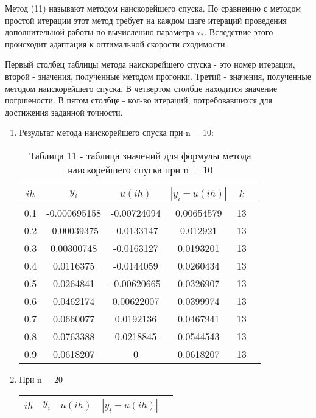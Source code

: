 \documentclass[a4paper,12pt]{article}
\begin{document}
Метод (11) называют методом наискорейшего спуска. По сравнению с методом простой итерации этот метод
требует на каждом шаге итераций проведения дополнительной работы по вычислению параметра $\tau_*$. 
Вследствие этого происходит адаптация к оптимальной скорости сходимости.

Первый столбец таблицы метода наискорейшего спуска - это номер итерации, второй - значения, полученные методом 
прогонки. Третий - значения, полученные методом наискорейшего спуска. В четвертом столбце находится значение погршености.
В пятом столбце - кол-во итераций, потребовавшихся для достижения заданной точности.

\begin{enumerate}[label = \arabic*.]
  \item{Результат метода наискорейшего спуска при n = 10:
    \begin{table}[h]
      \centering
      \begin{tabular}{|c|c|c|c|c|c|}
        \hline
        $ih$ & $y_i$ & $u(ih)$ & $\left|y_i-u(ih)\right|$ & $k$\\ \hline
        0.1 & -0.000695158 &  -0.00724094 &   0.00654579 & 13\\ \hline
        0.2 &  -0.00039375 &   -0.0133147 &     0.012921 & 13\\ \hline
        0.3 &   0.00300748 &   -0.0163127 &    0.0193201 & 13\\ \hline
        0.4 &    0.0116375 &   -0.0144059 &    0.0260434 & 13\\ \hline
        0.5 &    0.0264841 &  -0.00620665 &    0.0326907 & 13\\ \hline
        0.6 &    0.0462174 &   0.00622007 &    0.0399974 & 13\\ \hline
        0.7 &    0.0660077 &    0.0192136 &    0.0467941 & 13\\ \hline
        0.8 &    0.0763388 &    0.0218845 &    0.0544543 & 13\\ \hline
        0.9 &    0.0618207 &            0 &    0.0618207 & 13\\ \hline
      \end{tabular}
      \caption*{\small{Таблица 11 - таблица значений для формулы метода наискорейшего спуска при n = 10}}
    \end{table}
  }
  \newpage
  \item{При n = 20
    \begin{table}[h]
      \centering
      \begin{tabular}{|c|c|c|c|c|}
      \hline
      $ih$ & $y_i$ & $u(ih)$ & $\left|y_i-u(ih)\right|$\\ \hline

\end{tabular}
\end{table}}
\end{enumerate}
\end{document}
